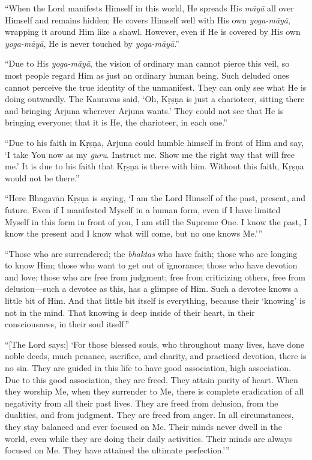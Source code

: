 \documentclass[12pt, twoside, openright]{memoir}
\begin{document}
\enquote{When the Lord manifests Himself in this world, He spreads His \textit{māyā} all over Himself and remains hidden; He covers Himself well with His own \textit{yoga-māyā}, wrapping it around Him like a shawl. However, even if He is covered by His own \textit{yoga-māyā}, He is never touched by \textit{yoga-māyā}.}

\enquote{Due to His \textit{yoga-māyā}, the vision of ordinary man cannot pierce this veil, so most people regard Him as just an ordinary human being. Such deluded ones cannot perceive the true identity of the unmanifest. They can only see what He is doing outwardly. The Kauravas said, \enquote{Oh, Kṛṣṇa is just a charioteer, sitting there and bringing Arjuna wherever Arjuna wants.} They could not see that He is bringing everyone; that it is He, the charioteer, in each one.}

\enquote{Due to his faith in Kṛṣṇa, Arjuna could humble himself in front of Him and say, \enquote{I take You now as my \textit{guru}. Instruct me. Show me the right way that will free me.} It is due to his faith that Kṛṣṇa is there with him. Without this faith, Kṛṣṇa would not be there.}

\enquote{Here Bhagavān Kṛṣṇa is saying, \enquote{I am the Lord Himself of the past, present, and future. Even if I manifested Myself in a human form, even if I have limited Myself in this form in front of you, I am still the Supreme One. I know the past, I know the present and I know what will come, but no one knows Me.}}

\enquote{Those who are surrendered; the \textit{bhaktas} who have faith; those who are longing to know Him; those who want to get out of ignorance; those who have devotion and love; those who are free from judgment; free from criticizing others, free from delusion---such a devotee as this, has a glimpse of Him. Such a devotee knows a little bit of Him. And that little bit itself is everything, because their \enquote{knowing} is not in the mind. That knowing is deep inside of their heart, in their consciousness, in their soul itself.}

\enquote{[The Lord says:] \enquote{For those blessed souls, who throughout many lives, have done noble deeds, much penance, sacrifice, and charity, and practiced devotion, there is no sin. They are guided in this life to have good association, high association. Due to this good association, they are freed. They attain purity of heart. When they worship Me, when they surrender to Me, there is complete eradication of all negativity from all their past lives. They are freed from delusion, from the dualities, and from judgment. They are freed from anger. In all circumstances, they stay balanced and ever focused on Me. Their minds never dwell in the world, even while they are doing their daily activities. Their minds are always focused on Me. They have attained the ultimate perfection.}}
\end{document}
